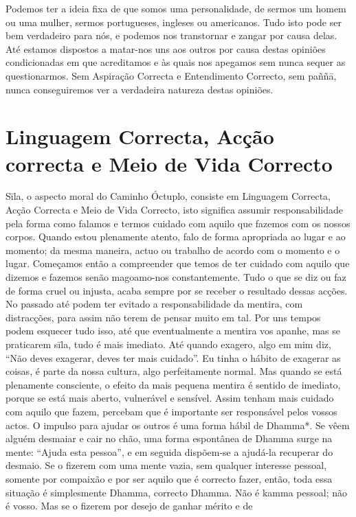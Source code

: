 Podemos ter a ideia fixa de que somos uma personalidade, de sermos um homem ou uma mulher, sermos portugueses, ingleses ou americanos. Tudo isto pode ser bem
verdadeiro para nós, e podemos nos transtornar e zangar por
causa delas. Até estamos dispostos a matar-nos uns aos outros por causa destas opiniões condicionadas em que acreditamos e às quais nos apegamos sem nunca sequer as questionarmos. Sem Aspiração Correcta e Entendimento Correcto,
sem paññā, nunca conseguiremos ver a verdadeira natureza
destas opiniões.

\section{Linguagem Correcta, Acção correcta e Meio de Vida Correcto}

Sīla, o aspecto moral do Caminho Óctuplo, consiste em
Linguagem Correcta, Acção Correcta e Meio de Vida
Correcto, isto significa assumir responsabilidade pela forma
como falamos e termos cuidado com aquilo que fazemos com
os nossos corpos. Quando estou plenamente atento, falo de
forma apropriada ao lugar e ao momento; da mesma maneira,
actuo ou trabalho de acordo com o momento e o lugar.
Começamos então a compreender que temos de ter cuidado com aquilo que dizemos e fazemos senão magoamo-nos
constantemente. Tudo o que se diz ou faz de forma cruel ou
injusta, acaba sempre por se receber o resultado dessas
acções. No passado até podem ter evitado a responsabilidade
da mentira, com distracções, para assim não terem de pensar
muito em tal. Por uns tempos podem esquecer tudo isso, até
que eventualmente a mentira vos apanhe, mas se praticarem
sīla, tudo é mais imediato. Até quando exagero, algo em
mim diz, “Não deves exagerar, deves ter mais cuidado”. Eu
tinha o hábito de exagerar as coisas, é parte da nossa cultura,
algo perfeitamente normal. Mas quando se está plenamente
consciente, o efeito da mais pequena mentira é sentido de
imediato, porque se está mais aberto, vulnerável e sensível.
Assim tenham mais cuidado com aquilo que fazem, percebam
que é importante ser responsável pelos vossos actos.
O impulso para ajudar os outros é uma forma hábil de
Dhamma*. Se vêem alguém desmaiar e cair no chão, uma
forma espontânea de Dhamma surge na mente: “Ajuda esta
pessoa”, e em seguida dispõem-se a ajudá-la recuperar do
desmaio. Se o fizerem com uma mente vazia, sem qualquer
interesse pessoal, somente por compaixão e por ser aquilo que
é correcto fazer, então, toda essa situação é simplesmente
Dhamma, correcto Dhamma. Não é kamma pessoal; não é
vosso. Mas se o fizerem por desejo de ganhar mérito e de
